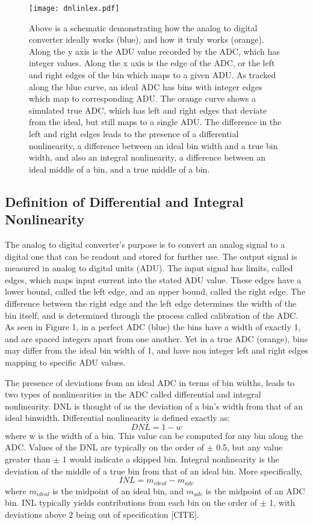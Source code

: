 \documentclass[11pt, letterpaper]{article}
\begin{document}
\begin{figure}
	\texttt{[image: dnlinlex.pdf]}
	\caption{Above is a schematic demonstrating how the analog to digital converter ideally works (blue), and how it truly works (orange). Along the y axis is the ADU value recorded by the ADC, which has integer values. Along the x axis is the edge of the ADC, or the left and right edges of the bin which maps to a given ADU. As tracked along the blue curve, an ideal ADC has bins with integer edges which map to corresponding ADU. The orange curve shows a simulated true ADC, which has left and right edges that deviate from the ideal, but still maps to a single ADU. The difference in the left and right edges leads to the presence of a differential nonlinearity, a difference between an ideal bin width and a true bin width, and also an integral nonlinearity, a difference between an ideal middle of a bin, and a true middle of a bin.}
\end{figure}

\subsection{Definition of Differential and Integral Nonlinearity}
\indent 


The analog to digital converter’s purpose is to convert an analog signal to a digital one that can be readout and stored for further use. 
The output signal is measured in analog to digital units (ADU). 
The input signal has limits, called edges, which maps input current into the stated ADU value. 
These edges have a lower bound, called the left edge, and an upper bound, called the right edge.
The difference between the right edge and the left edge determines the width of the bin itself, and is determined through the process called calibration of the ADC. 
As seen in Figure 1, in a perfect ADC (blue) the bins have a width of exactly 1, and are spaced integers apart from one another. 
Yet in a true ADC (orange), bins may differ from the ideal bin width of 1, and have non integer left and right edges mapping to specific ADU values. 
\indent 


The presence of deviations from an ideal ADC in terms of bin widths, leads to two types of nonlinearities in the ADC called differential and integral nonlinearity. 
DNL is thought of as the deviation of a bin's width from that of an ideal binwidth. 
Differential nonlinearity is defined exactly as: 
\begin{equation}\label{}
DNL =1- w  
\end{equation}
where w is the width of a bin. 
This value can be computed for any bin along the ADC. 
Values of the DNL are typically on the order of $\pm$ 0.5, but any value greater than $\pm$ 1 would indicate a skipped bin. 
Integral nonlinearity is the deviation of the middle of a true bin from that of an ideal bin.
More specifically, 
\begin{equation}\label{}
INL = m_{ideal} - m_{adc} 
\end{equation}
where $m_{ideal}$ is the midpoint of an ideal bin, and $m_{adc}$ is the midpoint of an ADC bin. 
INL typically yields contributions from each bin on the order of $\pm$ 1, with deviations above 2 being out of specification [CITE]. 
\indent
\end{document}
